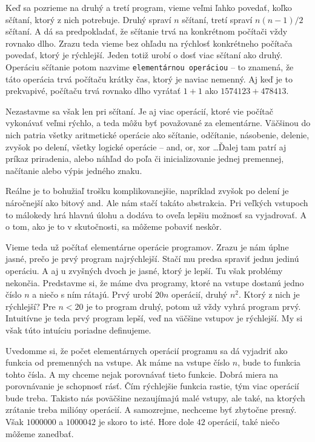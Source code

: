 Keď sa pozrieme na druhý a tretí program, vieme veľmi ľahko povedať, koľko sčítaní, ktorý z nich
potrebuje. Druhý spraví $n$ sčítaní, tretí spraví $n(n-1)/2$ sčítaní. A dá sa predpokladať, že
sčítanie trvá na konkrétnom počítači vždy rovnako dlho. Zrazu teda vieme bez ohľadu na rýchlosť
konkrétneho počítača povedať, ktorý je rýchlejší. Jeden totiž urobí o dosť viac sčítaní ako druhý.
Operáciu sčítanie potom nazvime \texttt{elementárnou operáciou} -- to znamená, že táto operácia trvá
počítaču krátky čas, ktorý je naviac nemenný. Aj keď je to prekvapivé, počítaču trvá rovnako dlho
vyrátať $1+1$ ako $1574123+478413$.

Nezastavme sa však len pri sčítaní. Je aj viac operácií, ktoré vie počítač vykonávať veľmi rýchlo, a
teda môžu byť považované za elementárne. Väčšinou do nich patria všetky aritmetické operácie ako
sčítanie, odčítanie, násobenie, delenie, zvyšok po delení, všetky logické operácie -- and, or, xor
\dots Ďalej tam patrí aj príkaz priradenia, alebo náhľad do poľa či inicializovanie jednej
premennej, načítanie alebo výpis jedného znaku.

Reálne je to bohužiaľ trošku komplikovanejšie, napríklad zvyšok po delení je náročnejší ako bitový
and. Ale nám stačí takáto abstrakcia. Pri veľkých vstupoch to málokedy hrá hlavnú úlohu a dodáva to
oveľa lepšiu možnosť sa vyjadrovať. A o tom, ako je to v skutočnosti, sa môžeme pobaviť neskôr.

Vieme teda už počítať elementárne operácie programov. Zrazu je nám úplne jasné, prečo je prvý
program najrýchlejší. Stačí mu predsa spraviť jednu jedinú operáciu. A aj u zvyšných dvoch je jasné,
ktorý je lepší. Tu však problémy nekončia. Predstavme si, že máme dva programy, ktoré na vstupe
dostanú jedno číslo $n$ a niečo s ním rátajú. Prvý urobí $20n$ operácií, druhý $n^2$. Ktorý z nich
je rýchlejší? Pre $n<20$ je to program druhý, potom už vždy vyhrá program prvý. Intuitívne je teda
prvý program lepší, veď na väčšine vstupov je rýchlejší. My si však túto intuíciu poriadne
definujeme.


Uvedomme si, že počet elementárnych operácií programu sa dá vyjadriť ako
funkcia od premenných na vstupe. Ak máme na vstupe číslo $n$, bude to funkcia tohto čísla. A my
chceme nejak porovnávať tieto funkcie. Dobrá miera na porovnávanie je schopnosť rásť. Čím rýchlejšie funkcia
rastie, tým viac operácií bude treba. Takisto nás poväčšine nezaujímajú malé vstupy, ale také, na
ktorých zrátanie treba milióny operácií. A samozrejme, nechceme byť zbytočne presný. Však $1000000$ a
$1000042$ je skoro to isté. Hore dole $42$ operácií, také niečo môžeme zanedbať.

